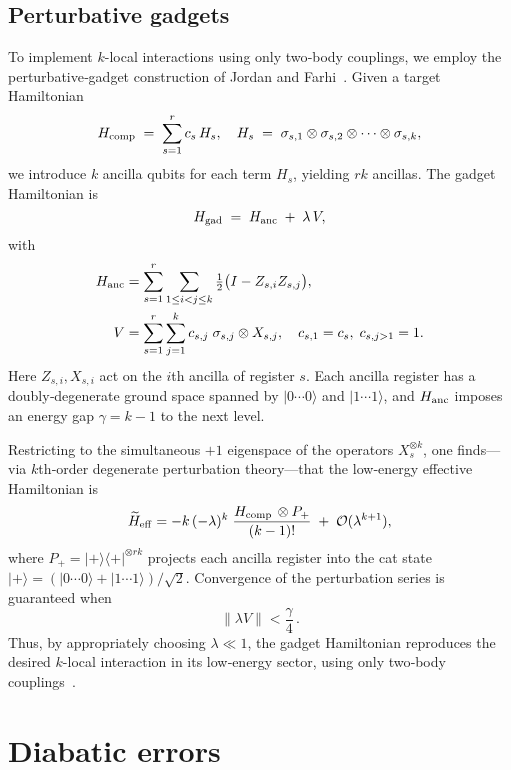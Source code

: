 \documentclass[reprint, amsmath,amssymb,nofootinbib, aps,superscriptaddress,longbibliography]{revtex4-1}
\begin{document}
\subsection{Perturbative gadgets}
To implement \(k\)-local interactions using only two‐body couplings, we employ the perturbative‐gadget construction of Jordan and Farhi~\cite{jordan2008perturbative}.  Given a target Hamiltonian
\begin{equation}
H_{\rm comp} \;=\; \sum_{s=1}^r c_s \,H_s,
\quad
H_s \;=\;\sigma_{s,1}\otimes\sigma_{s,2}\otimes\cdots\otimes\sigma_{s,k},
\end{equation}
we introduce \(k\) ancilla qubits for each term \(H_s\), yielding \(rk\) ancillas.  The gadget Hamiltonian is
\begin{equation}
H_{\rm gad} \;=\; H_{\rm anc} \;+\;\lambda\,V,
\end{equation}
with  
\begin{align}
H_{\rm anc}
&=\sum_{s=1}^r \sum_{1\le i<j\le k} \tfrac12\bigl(I - Z_{s,i}Z_{s,j}\bigr),\\
V
&=\sum_{s=1}^r \sum_{j=1}^k c_{s,j}\;\sigma_{s,j}\otimes X_{s,j},
\quad c_{s,1}=c_s,\;c_{s,j>1}=1.
\end{align}
Here \(Z_{s,i},X_{s,i}\) act on the \(i\)th ancilla of register \(s\).  Each ancilla register has a doubly‐degenerate ground space spanned by \(\lvert0\cdots0\rangle\) and \(\lvert1\cdots1\rangle\), and \(H_{\rm anc}\) imposes an energy gap \(\gamma=k-1\) to the next level.

Restricting to the simultaneous \(+1\) eigenspace of the operators \(X^{\otimes k}_s\), one finds—via \(k\)th‐order degenerate perturbation theory—that the low‐energy effective Hamiltonian is
\begin{equation}
\widetilde H_{\rm eff}
= -k\,(-\lambda)^k\;\frac{H_{\rm comp}\,\otimes P_+}{(k-1)!}
\;+\;\mathcal O(\lambda^{k+1}),
\end{equation}
where \(P_+=\lvert+\rangle\langle+\rvert^{\otimes rk}\) projects each ancilla register into the cat state \(\lvert+\rangle=(\lvert0\cdots0\rangle+\lvert1\cdots1\rangle)/\sqrt2\).  Convergence of the perturbation series is guaranteed when
\[
\|\lambda V\| < \frac{\gamma}{4}\,.
\]
Thus, by appropriately choosing \(\lambda\ll1\), the gadget Hamiltonian reproduces the desired \(k\)-local interaction in its low‐energy sector, using only two‐body couplings~\cite{jordan2008perturbative}.

\section{Diabatic errors}
\end{document}
